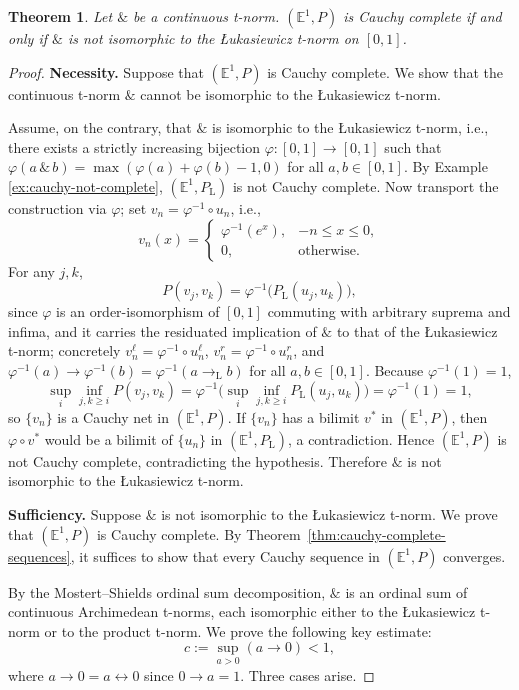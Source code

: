 \documentclass[preprint,3p,times]{elsarticle}
\theoremstyle{plain}
\newtheorem{thm}{Theorem}[section]
\theoremstyle{definition}
\newcommand{\Luk}{\mathrm{L}}
\numberwithin{equation}{section}
\begin{document}
\begin{thm}\label{thm:cauchy-completeness}
     Let $\&$ be a continuous t-norm. \((\mathbb{E}^1, P) \) is Cauchy complete if and only if $\&$ is not   isomorphic to the {\L}ukasiewicz t-norm on \([0,1]\).
\end{thm}
\begin{proof}
\noindent\textbf{Necessity.}
Suppose that $(\mathbb{E}^{1},P)$ is Cauchy complete. We show that the continuous t-norm $\&$ cannot be isomorphic to the {\L}ukasiewicz t-norm.

Assume, on the contrary, that $\&$ is isomorphic to the {\L}ukasiewicz t-norm, i.e., there exists a strictly increasing bijection $\varphi:[0,1]\to[0,1]$ such that $\varphi(a\,\&\,b)=\max(\varphi(a)+\varphi(b)-1,0)$ for all $a,b\in[0,1]$. By Example \ref{ex:cauchy-not-complete}, $(\mathbb{E}^{1},P_{\Luk})$ is not Cauchy complete.
Now transport the construction via $\varphi$; set $v_n=\varphi^{-1}\circ u_n$, i.e.,
\[
v_{n}(x)=\begin{cases}
\varphi^{-1}(e^{x}), & -n\leq x\leq 0,\\[2pt]
0, & \text{otherwise}.
\end{cases}
\]
For any $j,k$,
\[
P(v_{j},v_{k})=\varphi^{-1}\big(P_{\Luk}(u_{j},u_{k})\big),
\]
since $\varphi$ is an order-isomorphism of $[0,1]$ commuting with arbitrary suprema and infima, and it carries the residuated implication of $\&$ to that of the {\L}ukasiewicz t-norm; concretely $v_n^\ell=\varphi^{-1}\circ u_n^\ell$, $v_n^r=\varphi^{-1}\circ u_n^r$, and $\varphi^{-1}(a)\to\varphi^{-1}(b)=\varphi^{-1}(a\to_{\Luk}b)$ for all $a,b\in[0,1]$.
Because $\varphi^{-1}(1)=1$,
\[
\sup_{i}\inf_{j,k\geq i}P(v_{j},v_{k})
=\varphi^{-1}\!\Big(\sup_{i}\inf_{j,k\geq i}P_{\Luk}(u_{j},u_{k})\Big)
=\varphi^{-1}(1)=1,
\]
so $\{v_{n}\}$ is a Cauchy net in $(\mathbb{E}^{1},P)$. If $\{v_{n}\}$ has a bilimit $v^{*}$ in $(\mathbb{E}^{1},P)$, then $\varphi\circ v^{*}$ would be a bilimit of $\{u_{n}\}$ in $(\mathbb{E}^{1},P_{\Luk})$, a contradiction. Hence $(\mathbb{E}^{1},P)$ is not Cauchy complete, contradicting the hypothesis. Therefore $\&$ is not isomorphic to the {\L}ukasiewicz t-norm.

\medskip
\noindent\textbf{Sufficiency.}
 Suppose \(\&\) is not isomorphic to the {\L}ukasiewicz t-norm. We prove that \((\mathbb{E}^1,P)\) is Cauchy complete. By Theorem~\ref{thm:cauchy-complete-sequences}, it suffices to show that every Cauchy sequence in \((\mathbb{E}^1,P)\) converges.


By the Mostert--Shields ordinal sum decomposition, $\&$ is an ordinal sum of continuous Archimedean t-norms, each isomorphic either to the {\L}ukasiewicz t-norm or to the product t-norm. We prove the following key estimate:
\begin{equation}\label{eq:key}
c:=\sup_{a>0}(a\to 0)<1,
\end{equation}
where $a\to0=a\leftrightarrow0$ since $0\to a=1$. Three cases arise.


\end{proof}
\end{document}
